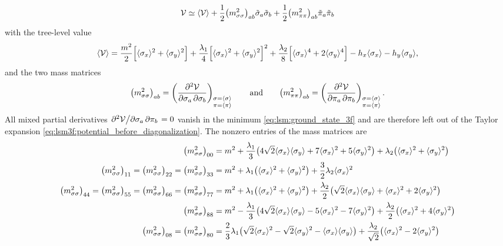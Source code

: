 \begin{equation}
	\mathcal{V} \simeq \langle \mathcal{V} \rangle + \frac12 \big(m^2_{\sigma\sigma}\big)_{ab} \tilde{\sigma}_a \tilde{\sigma}_b + \frac12 \big(m^2_{\pi\pi}\big)_{ab} \tilde{\pi}_a \tilde{\pi}_b
\label{eq:lsm3f:potential_before_diagonalization}
\end{equation}
with the tree-level value
\begin{equation}
	\langle \mathcal{V} \rangle = \frac{m^2}{2} \Big[ \langle \sigma_x \rangle^2 + \langle \sigma_y \rangle^2 \Big] + \frac{\lambda_1}{4} \Big[ \langle \sigma_x \rangle^2 + \langle \sigma_y \rangle^2 \Big]^2 + \frac{\lambda_2}{8} \Big[ \langle \sigma_x \rangle^4 + 2 \langle \sigma_y \rangle^4 \Big] - h_x \langle \sigma_x \rangle - h_y \langle \sigma_y \rangle,
\label{eq:lsm:potential_tree_3f}
\end{equation}
and the two mass matrices
\begin{equation}
	\big(m^2_{\sigma\sigma}\big)_{ab} = \pdv{\mathcal{V}}{\sigma_a, \sigma_b}_{\substack{\sigma=\langle \sigma \rangle\\\pi=\langle \pi \rangle}}
	\qquad \text{and} \qquad
	\big(m^2_{\pi\pi}\big)_{ab}       = \pdv{\mathcal{V}}{\pi_a, \pi_b}_{\substack{\sigma=\langle \sigma \rangle\\\pi=\langle \pi \rangle}}.
\end{equation}
All mixed partial derivatives $\pdv{\mathcal{V}}/{\sigma_a,\pi_b} = 0$ vanish in the minimum \eqref{eq:lsm:ground_state_3f} and are therefore left out of the Taylor expansion \eqref{eq:lsm3f:potential_before_diagonalization}.
The nonzero entries of the mass matrices are
\begin{equation}
\begin{split}
	\big(m^2_{\sigma\sigma}\big)_{00} &= m^2 + \frac{\lambda_1}{3} \big(4 \sqrt{2} \avg{\sigma_x} \avg{\sigma_y} + 7 \avg{\sigma_x}^2 + 5 \avg{\sigma_y}^2\big) + \lambda_2 \big(\avg{\sigma_x}^2 + \avg{\sigma_y}^2\big) \\
	\big(m^2_{\sigma\sigma}\big)_{11} =
	\big(m^2_{\sigma\sigma}\big)_{22} =
	\big(m^2_{\sigma\sigma}\big)_{33} &= m^2 + \lambda_1 \big(\avg{\sigma_x}^2 + \avg{\sigma_y}^2\big)                                              + \frac32 \lambda_2 \avg{\sigma_x}^2 \\
	\big(m^2_{\sigma\sigma}\big)_{44} =
	\big(m^2_{\sigma\sigma}\big)_{55} =
	\big(m^2_{\sigma\sigma}\big)_{66} =
	\big(m^2_{\sigma\sigma}\big)_{77} &= m^2 + \lambda_1 \big(\avg{\sigma_x}^2 + \avg{\sigma_y}^2\big) + \frac{\lambda_2}{2} \big(\sqrt{2} \avg{\sigma_x} \avg{\sigma_y} + \avg{\sigma_x}^2 + 2 \avg{\sigma_y}^2\big) \\
	\big(m^2_{\sigma\sigma}\big)_{88} &= m^2 - \frac{\lambda_1}{3} \big(4 \sqrt{2} \avg{\sigma_x} \avg{\sigma_y} - 5 \avg{\sigma_x}^2 - 7 \avg{\sigma_y}^2\big) + \frac{\lambda_2}{2} \big(\avg{\sigma_x}^2 + 4 \avg{\sigma_y}^2\big) \\
	\big(m^2_{\sigma\sigma}\big)_{08} =
	\big(m^2_{\sigma\sigma}\big)_{80} &= \frac23 \lambda_1 \big(\sqrt{2} \avg{\sigma_x}^2 - \sqrt{2} \avg{\sigma_y}^2 - \avg{\sigma_x} \avg{\sigma_y}\big) + \frac{\lambda_2}{\sqrt{2}} \big(\avg{\sigma_x}^2 - 2 \avg{\sigma_y}^2\big)
\end{split}%
\label{eq:lsm3f:mass_sigma_sigma}
\end{equation}%
